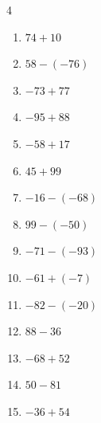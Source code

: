 \begin{multicols}{4}
\begin{enumerate}
        \phantom{$=-40$}

  \item $74+10$

        \phantom{$=84$}

  \item $58-(-76)$

        \phantom{$=134$}

\columnbreak %

\resetques

  \item $-73+77$

        \phantom{$=4$}

  \item $-95+88$

        \phantom{$=-7$}

  \item $-58+17$

        \phantom{$=-41$}

  \item $45+99$

        \phantom{$=144$}

  \item $-16-(-68)$

        \phantom{$=52$}

  \item $99-(-50)$

        \phantom{$=149$}

  \item $-71-(-93)$

        \phantom{$=22$}

  \item $-61+(-7)$

        \phantom{$=-68$}

  \item $-82-(-20)$

        \phantom{$=-62$}

  \item $88-36$

        \phantom{$=52$}

  \item $-68+52$

        \phantom{$=-16$}

  \item $50-81$

        \phantom{$=-31$}

  \item $-36+54$

        \phantom{$=18$}


\end{enumerate}
\end{multicols}
